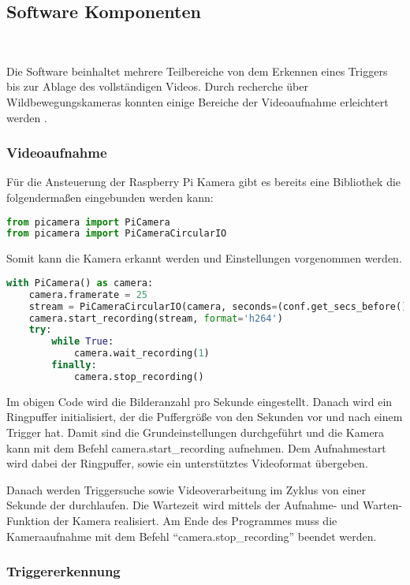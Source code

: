 \subsection{Software Komponenten} \
\label{subsec:evalsys_software}

Die Software beinhaltet mehrere Teilbereiche von dem Erkennen eines Triggers bis zur Ablage des vollständigen Videos. Durch recherche über Wildbewegungskameras konnten einige Bereiche der Videoaufnahme erleichtert werden \cite{rasp_ansteuerung}.

\subsubsection{Videoaufnahme}

Für die Ansteuerung der Raspberry Pi Kamera gibt es bereits eine Bibliothek die folgendermaßen eingebunden werden kann:

\begin{lstlisting}[language=Python]
from picamera import PiCamera
from picamera import PiCameraCircularIO
\end{lstlisting}

Somit kann die Kamera erkannt werden und Einstellungen vorgenommen werden.

\begin{lstlisting}[language=Python]
with PiCamera() as camera:
	camera.framerate = 25
	stream = PiCameraCircularIO(camera, seconds=(conf.get_secs_before() + conf.get_secs_after()))
	camera.start_recording(stream, format='h264')
	try:
		while True:
			camera.wait_recording(1)	
		finally:
			camera.stop_recording()
\end{lstlisting}

Im obigen Code wird die Bilderanzahl pro Sekunde eingestellt. Danach wird ein Ringpuffer initialisiert, der die Puffergröße von den Sekunden vor und nach einem Trigger hat. Damit sind die Grundeinstellungen durchgeführt und die Kamera kann mit dem Befehl \glqq{} camera.start\_recording \grqq{} aufnehmen. Dem Aufnahmestart wird dabei der Ringpuffer, sowie ein unterstütztes Videoformat übergeben.

Danach werden Triggersuche sowie Videoverarbeitung im Zyklus von einer Sekunde der durchlaufen. Die Wartezeit wird mittels der Aufnahme- und Warten-Funktion der Kamera realisiert. Am Ende des Programmes muss die Kameraaufnahme mit dem Befehl "`camera.stop\_recording"' beendet werden.

\subsubsection{Triggererkennung}


